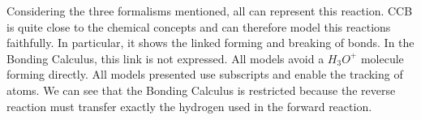 \documentclass[runningheads]{llncs}
\begin{document}
Considering the three formalisms mentioned, all can represent this reaction. CCB is quite close to the chemical concepts and can therefore model this reactions faithfully. In particular, it shows the linked forming and breaking of bonds. In the Bonding Calculus, this link is not expressed. All models avoid a $H_3O^+$ molecule forming directly. All models presented use subscripts and enable the tracking of atoms. We can see that the Bonding Calculus is restricted because the reverse reaction must transfer exactly the hydrogen used in the forward reaction. 


{}

\end{document}
